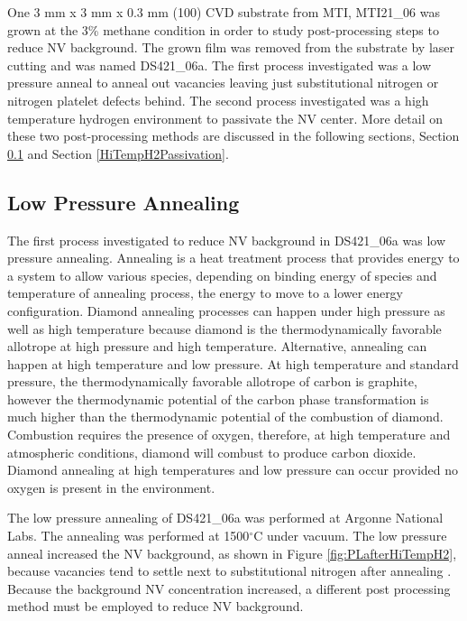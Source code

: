 One 3 mm x 3 mm x 0.3 mm (100) CVD substrate from MTI, MTI21\_06 was grown at the 3\% methane condition in order to study post-processing steps to reduce NV background. The grown film was removed from the substrate by laser cutting and was named DS421\_06a. The first process investigated was a low pressure anneal to anneal out vacancies leaving just substitutional nitrogen or nitrogen platelet defects behind. The second process investigated was a high temperature hydrogen environment to passivate the NV center. More detail on these two post-processing methods are discussed in the following sections, Section \ref{LowPressureAnneal} and Section \ref{HiTempH2Passivation}.

\subsection{Low Pressure Annealing}
\label{LowPressureAnneal}
\indent

The first process investigated to reduce NV background in DS421\_06a was low pressure annealing. Annealing is a heat treatment process that provides energy to a system to allow various species, depending on binding energy of species and temperature of annealing process, the energy to move to a lower energy configuration. Diamond annealing processes can happen under high pressure as well as high temperature because diamond is the thermodynamically favorable allotrope at high pressure and high temperature. Alternative, annealing can happen at high temperature and low pressure. At high temperature and standard pressure, the thermodynamically favorable allotrope of carbon is graphite, however the thermodynamic potential of the carbon phase transformation is much higher than the thermodynamic potential of the combustion of diamond. Combustion requires the presence of oxygen, therefore, at high temperature and atmospheric conditions, diamond will combust to produce carbon dioxide. Diamond annealing at high temperatures and low pressure can occur provided no oxygen is present in the environment. 

The low pressure annealing of DS421\_06a was performed at Argonne National Labs. The annealing was performed at 1500$^\circ$C under vacuum. The low pressure anneal increased the NV background, as shown in Figure \ref{fig:PLafterHiTempH2}, because vacancies tend to settle next to substitutional nitrogen after annealing \cite{Savage2021}. Because the background NV concentration increased, a different post processing method must be employed to reduce NV background.

